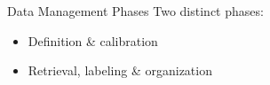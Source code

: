 \begin{frame}{Data Management Phases}
  Two distinct phases:
  \begin{itemize}
    \item Definition \& calibration
    \item Retrieval, labeling \& organization
  \end{itemize}
\end{frame}
